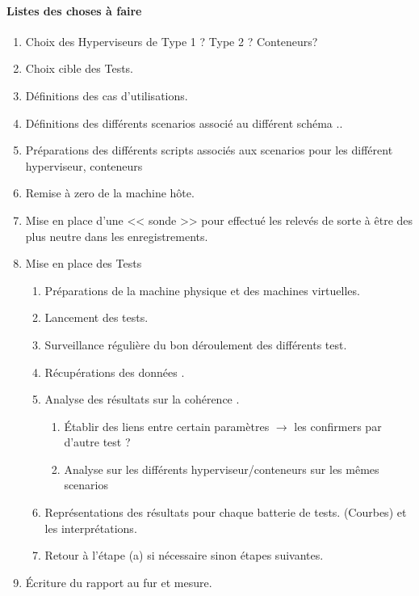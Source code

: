 \documentclass[french]{article}
\begin{document}
\paragraph{Listes des choses à faire}
\begin{enumerate}
	\item Choix des Hyperviseurs de Type 1 ? Type 2 ? Conteneurs?
	\item Choix cible des Tests.
	\item Définitions des cas d'utilisations. 
	\item Définitions des différents scenarios associé au différent schéma ..
	\item Préparations des différents scripts associés aux scenarios pour les différent hyperviseur, conteneurs 
	\item Remise à zero de la machine hôte.
	\item Mise en place d'une << sonde >> pour effectué les relevés de sorte à être des plus neutre dans les enregistrements.
	\item Mise en place des Tests 
		\begin{enumerate}
			\item Préparations de la machine physique et des machines virtuelles. 
			\item Lancement des tests.
			\item Surveillance régulière du bon déroulement des différents test.
			\item Récupérations des données . 
			\item Analyse des résultats sur la cohérence .
			\begin{enumerate}
				\item Établir des liens entre certain paramètres $\rightarrow $ les confirmers par d'autre test ? 
				\item Analyse sur les différents hyperviseur/conteneurs sur les mêmes scenarios 
			\end{enumerate}
			\item Représentations des résultats pour chaque batterie de tests. (Courbes) et les interprétations.
			\item Retour à l’étape (a) si nécessaire sinon étapes suivantes.
		\end{enumerate}
	\item Écriture du rapport au fur et mesure.	
			
\end{enumerate}
\end{document}
